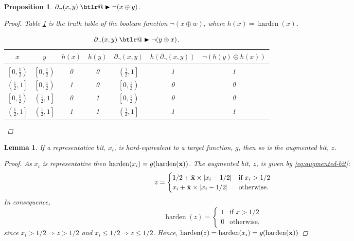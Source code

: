 \documentclass{article} %
\makeatletter
\newtheorem{prop}{Proposition}
\newtheorem{lemma}{Lemma}
\DeclareRobustCommand{\btright}{\mathrel{\mathpalette\btlr@\blacktriangleright}}
\newcommand{\btlr@}[2]{%
	\begingroup
	\sbox\z@{$\m@th#1\triangleright$}%
	\sbox\tw@{\resizebox{1.1\wd\z@}{1.1\ht\z@}{\raisebox{\depth}{$\m@th#1\mkern-1mu#2$}}}%
	\ht\tw@=\ht\z@ \dp\tw@=\dp\z@ \wd\tw@=\wd\z@
	\copy\tw@
	\endgroup
}
\makeatother
\begin{document}
\begin{prop}\label{prop:not}
	$\partial_{\neg}(x,y) \btright \neg (x \oplus y)$.
\begin{proof}
	Table \ref{not-table} is the truth table of the boolean function $\neg (x \oplus w)$, where $h(x) = \operatorname{harden}(x)$.
	\begin{table}[h!]
		\begin{center}
			\begin{tabular}{ccccccc}
				\multicolumn{1}{c}{$x$}  &\multicolumn{1}{c}{$y$}  &\multicolumn{1}{c}{$h(x)$}  &\multicolumn{1}{c}{$h(y)$} &\multicolumn{1}{c}{$\partial_{\neg}(x, y)$} &\multicolumn{1}{c}{$h(\partial_{\neg}(x, y))$}
				&\multicolumn{1}{c}{$\neg (h(y) \oplus h(x))$}
				\\ \hline \\
				$\left[0, \frac{1}{2}\right)$ & $\left[0, \frac{1}{2}\right)$ & 0 & 0 & $\left(\frac{1}{2},1\right]$ & 1 & 1\\[0.1cm] 
				$\left(\frac{1}{2}, 1\right]$ & $\left[0, \frac{1}{2}\right)$ &1 & 0 & $\left[0, \frac{1}{2}\right)$ & 0 & 0\\[0.1cm]
				$\left[0, \frac{1}{2}\right)$ & $\left(\frac{1}{2}, 1\right]$ &0 & 1 & $\left[0, \frac{1}{2}\right)$ & 0 & 0\\[0.1cm]
				$\left(\frac{1}{2}, 1\right]$ & $\left(\frac{1}{2}, 1\right]$ &1 & 1 & $\left(\frac{1}{2}, 1\right]$ & 1 & 1\\[0.1cm]
			\end{tabular}
		\end{center}
		\caption{$\partial_{\neg}(x,y) \btright \neg (y \oplus x)$.}\label{not-table}
	\end{table}
\end{proof}
\end{prop}

\begin{lemma}\label{prop:augmented}
	If a representative bit, $x_{i}$, is hard-equivalent to a target function, $g$, then so is the augmented bit, $z$.
	\begin{proof}
		As $x_{i}$ is representative then $\operatorname{harden}(x_{i}) = g(\operatorname{harden}({\bf x}))$. The augmented bit, $z$, is given by  \eqref{eq:augmented-bit}:
		\begin{equation*}
		z = \begin{cases}
		1/2 + \bar{\bf x}\times|x_{i} - 1/2| & \text{if } x_{i} > 1/2 \\
		x_{i} + \bar{\bf x}\times|x_{i} - 1/2| & \text{otherwise.}
		\end{cases}
		\end{equation*}
		In consequence,
		\begin{equation*}
		\operatorname{harden}(z) = \begin{cases}
		1 & \text{if } x > 1/2 \\
		0 & \text{otherwise,}
		\end{cases}
		\end{equation*}
		since $x_{i} > 1/2 \Rightarrow z > 1/2$ and $x_{i} \leq 1/2 \Rightarrow z \leq 1/2$. Hence, $\operatorname{harden}(z) = \operatorname{harden}(x_{i}) = g(\operatorname{harden}({\bf x}))$
	\end{proof}
\end{lemma}
\end{document}
